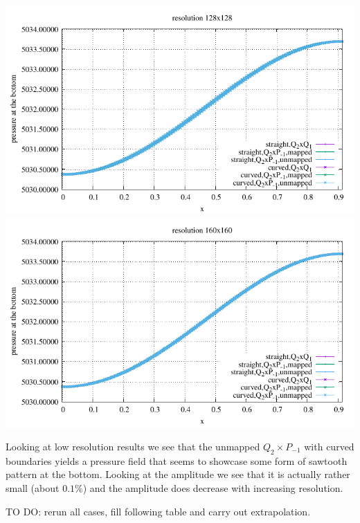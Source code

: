 \begin{center}
\includegraphics[width=14cm]{python_codes/fieldstone_25/results/isoviscous/pbottom128.pdf}\\
\includegraphics[width=14cm]{python_codes/fieldstone_25/results/isoviscous/pbottom160.pdf}
\end{center}

Looking at low resolution results we see that the unmapped $Q_2\times P_{-1}$ with curved boundaries
yields a pressure field that seems to showcase some form of sawtooth pattern at the bottom. 
Looking at the amplitude we see that it is actually rather small (about $0.1\%$) and the amplitude 
does decrease with increasing resolution.


\vspace{1cm}

{\color{red} TO DO: rerun all cases, fill following table and carry out extrapolation. }

